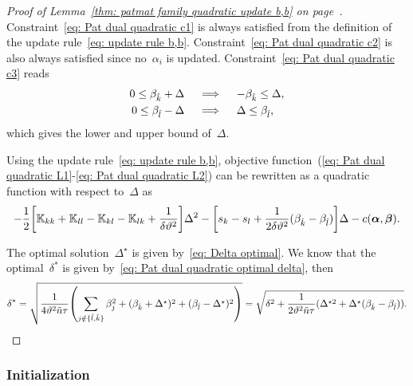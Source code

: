 \begin{proof}[Proof of Lemma~\ref{thm: patmat family quadratic update b,b} on page~\pageref{thm: patmat family quadratic update b,b}]
  Constraint~\eqref{eq: Pat dual quadratic c1} is always satisfied from the definition of the update rule~\eqref{eq: update rule b,b}. Constraint~\eqref{eq: Pat dual quadratic c2} is also always satisfied since no~$\alpha_i$ is updated. Constraint~\eqref{eq: Pat dual quadratic c3} reads
  \begin{align*}
    0 \leq \beta_{\hat{k}} + \Delta
    & \quad \implies \quad
    - \beta_{\hat{k}} \leq \Delta, \\
    0 \leq \beta_{\hat{l}} - \Delta
    & \quad \implies \quad
    \Delta \leq \beta_{\hat{l}}, \\
  \end{align*}
  which gives the lower and upper bound of~$\Delta.$
  
  Using the update rule~\eqref{eq: update rule b,b}, objective function~(\ref{eq: Pat dual quadratic L1}-\ref{eq: Pat dual quadratic L2}) can be rewritten as a quadratic function with respect to~$\Delta$ as
  \begin{equation*}
    - \frac{1}{2} \Brac[s]{\K_{kk} + \K_{ll} - \K_{kl} - \K_{lk} + \frac{1}{\delta\vartheta^2}} \Delta^2
    - \Brac[s]{s_k - s_l + \frac{1}{2\delta\vartheta^2}(\betak - \betal)} \Delta
    - c(\bm{\alpha}, \bm{\beta}).
  \end{equation*}
  
  The optimal solution~$\Delta^{\star}$ is given by~\eqref{eq: Delta optimal}.   We know that the optimal~$\delta^*$ is given by~\eqref{eq: Pat dual quadratic optimal delta}, then
  \begin{equation*}
    \delta^*
      = \sqrt{\frac{1}{4\vartheta^2 \ntil \tau} \Brac{\sum_{j \notin \{\hat{l}, \hat{k}\}} \beta_j^2 + (\betak + \Delta^\star)^2 + (\betal - \Delta^\star)^2}} 
      = \sqrt{\delta^2 + \frac{1}{2\vartheta^2 \ntil \tau} (\Delta^{\star2} + \Delta^\star (\betak - \betal))}.
  \end{equation*}
\end{proof}

\pagebreak

\subsubsection{Initialization}

